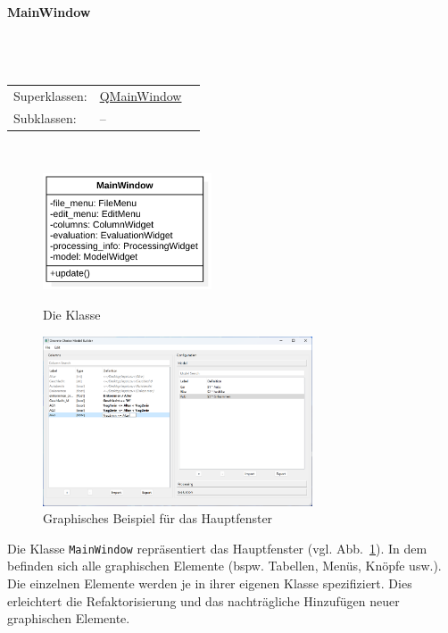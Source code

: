 \documentclass{article}
\newcommand{\classheader}[2][]{\paragraph{#2}
\mbox{}\textit{#1}\\\\}
\newcommand{\classref}[1]{\texttt{\nameref{cls:#1}}}
\begin{document}
\classheader{MainWindow}\label{cls:MainWindow}
\begin{tabular}{lll}
 Superklassen: & \href{https://doc.qt.io/qt-6/qmainwindow.html}{QMainWindow}\\
 Subklassen: & --\\
\end{tabular}\\

\begin{figure}[H]%
    \centering
    \begin{minipage}[b]{0.4\textwidth}
        \centering
        \includegraphics[width=5cm]{entwurf/Entwurf_dokument/img/klassenView/MainWindow.png}
        \caption{Die Klasse \classref{MainWindow}}
    \end{minipage}
    \hfill
    \begin{minipage}[b]{0.4\textwidth}
        \includegraphics[width=8cm]{specifications/img/gui-screenshots/columns-editing+model.png}
        \caption{Graphisches Beispiel für das Hauptfenster}
        \label{fig:guiMainWindow}
    \end{minipage}
\end{figure}
Die Klasse \texttt{MainWindow} repräsentiert das Hauptfenster (vgl. Abb.~\ref{fig:guiMainWindow}). In dem befinden sich alle graphischen Elemente (bspw. Tabellen, Menüs, Knöpfe usw.). Die einzelnen Elemente werden je in ihrer eigenen Klasse spezifiziert. Dies erleichtert die Refaktorisierung und das nachträgliche Hinzufügen neuer graphischen Elemente.
\\\\
\end{document}
